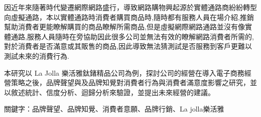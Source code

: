 因近年來隨著時代變遷網際網路盛行，導致網路購物興起源於實體通路商紛紛轉型向虛擬通路，本以實體通路時消費者購買商品時,隨時都有服務人員在場介紹,推銷幫助消費者更能瞭解購買的商品瞭解所需商品,但是虛擬網際網路通路並沒有像實體通路,服務人員隨時在旁協助因此很多公司並無法有效的瞭解網路消費者所需的,對於消費者是否滿意或其販售的商品,因此導致無法猜測試是否服務到客戶更難以測試未來的消費行為.

本研究以 La Jolla 樂活雅鈦鍺精品公司為例，探討公司的經營在導入電子商務經營策略之後，品牌聲望與及品牌知覺對消費者行為與消費者滿意度影響之研究，並以敘述統計、信度分析、迴歸分析來驗證，並提出未來經營的建議。
 





關鍵字：品牌聲望、品牌知覺、消費者意願、品牌行銷、La jolla樂活雅
